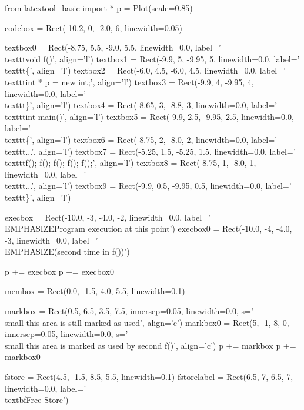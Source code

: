 \begin{python}
from latextool_basic import *
p = Plot(scale=0.85)

codebox = Rect(-10.2, 0, -2.0, 6, linewidth=0.05)

textbox0 = Rect(-8.75, 5.5, -9.0, 5.5, linewidth=0.0, label='\\texttt{void f()}', align='l')
textbox1 = Rect(-9.9, 5, -9.95, 5, linewidth=0.0, label='\\texttt{\{}', align='l')
textbox2 = Rect(-6.0, 4.5, -6.0, 4.5, linewidth=0.0, label='\\texttt{int * p = new int;}', align='l')
textbox3 = Rect(-9.9, 4, -9.95, 4, linewidth=0.0, label='\\texttt{\}}', align='l')
textbox4 = Rect(-8.65, 3, -8.8, 3, linewidth=0.0, label='\\texttt{int main()}', align='l')
textbox5 = Rect(-9.9, 2.5, -9.95, 2.5, linewidth=0.0, label='\\texttt{\{}', align='l')
textbox6 = Rect(-8.75, 2, -8.0, 2, linewidth=0.0, label='\\texttt{...}', align='l')
textbox7 = Rect(-5.25, 1.5, -5.25, 1.5, linewidth=0.0, label='\\texttt{f(); f(); f(); f(); f();}', align='l')
textbox8 = Rect(-8.75, 1, -8.0, 1, linewidth=0.0, label='\\texttt{...}', align='l')
textbox9 = Rect(-9.9, 0.5, -9.95, 0.5, linewidth=0.0, label='\\texttt{\}}', align='l')

execbox = Rect(-10.0, -3, -4.0, -2, linewidth=0.0,
               label='\\EMPHASIZE{Program execution at this point}')
execbox0 = Rect(-10.0, -4, -4.0, -3, linewidth=0.0,
               label='\\EMPHASIZE{(second time in f())}')

p += execbox
p += execbox0

membox = Rect(0.0, -1.5, 4.0, 5.5, linewidth=0.1)

markbox = Rect(0.5, 6.5, 3.5, 7.5, innersep=0.05, linewidth=0.0, s='{\\small this area is still marked as used}', align='c')
markbox0 = Rect(5, -1, 8, 0, innersep=0.05, linewidth=0.0, s='{\\small this area is marked as used by second f()}', align='c')
p += markbox
p += markbox0

fstore = Rect(4.5, -1.5, 8.5, 5.5, linewidth=0.1)
fstorelabel = Rect(6.5, 7, 6.5, 7, linewidth=0.0, label='\\textbf{Free Store}')


\end{python}
